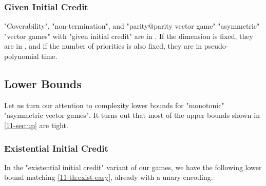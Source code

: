 \subsubsection{Given Initial Credit}
\label{11-sec:up-given}

\begin{theorem}
\label{11-th:avag-easy}
  "Coverability", "non-termination", and "parity@parity vector game"
  "asymmetric" "vector games" with "given initial credit" are in
  \kEXP[2].  If the dimension is fixed, they are in \EXP, and if the
  number of priorities is also fixed, they are in pseudo-polynomial
  time.
\end{theorem}


\subsection{Lower Bounds}
\label{11-sec:low}
Let us turn our attention to complexity lower bounds for "monotonic"
"asymmetric vector games".  It turns out that most of the upper bounds
shown in \cref{11-sec:up} are tight.
%
\subsubsection{Existential Initial Credit}
In the "existential initial credit" variant of our games, we have the
following lower bound matching \cref{11-th:exist-easy}, already with a
unary encoding.

